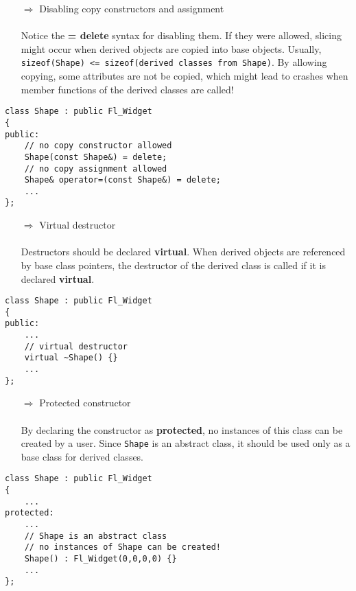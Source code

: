 \documentclass[10pt]{article}
\begin{document}
\begin{enumerate}
\item[$\Rightarrow$] Disabling copy constructors and assignment\\ \\ Notice the \textbf{= delete}  syntax for disabling them. If they were allowed, slicing might occur when derived objects are copied into base objects. Usually, \texttt{sizeof(Shape) <= sizeof(derived classes from Shape)}. By allowing copying, some attributes are not be copied, which might lead to crashes when member functions of the derived classes are called!
\end{enumerate}
\begin{lstlisting}
class Shape : public Fl_Widget
{
public:
    // no copy constructor allowed
    Shape(const Shape&) = delete;
    // no copy assignment allowed
    Shape& operator=(const Shape&) = delete;
    ...
};
\end{lstlisting}
\begin{enumerate}
\item[$\Rightarrow$] Virtual destructor\\ \\ Destructors should be declared \textbf{virtual}. When derived
objects are referenced by base class pointers, the destructor of the derived class is called if it is declared \textbf{virtual}.
\end{enumerate}
\begin{lstlisting}
class Shape : public Fl_Widget
{
public:
    ...
    // virtual destructor
    virtual ~Shape() {}
    ...
};
\end{lstlisting}
\begin{enumerate}
\item[$\Rightarrow$] Protected constructor\\ \\ By declaring the constructor as \textbf{protected}, no instances of this class can be created by a user. Since \texttt{Shape} is an abstract class, it should be used only as a base class for derived classes.
\end{enumerate}
\begin{lstlisting}
class Shape : public Fl_Widget
{
    ...
protected:
    ...
    // Shape is an abstract class
    // no instances of Shape can be created!
    Shape() : Fl_Widget(0,0,0,0) {}
    ...
};
\end{lstlisting}
\end{document}
